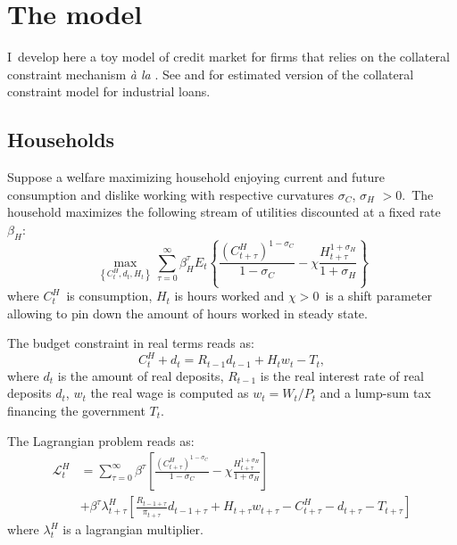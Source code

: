 \documentclass[a4paper,12pt]{article}%
\begin{document}
\FRONTPAGE


\section{The model}

I\ develop here a toy model of credit market for firms that relies on the
collateral constraint mechanism \textit{\`{a} la} \cite{kiyotaki1997credit}.
See \cite{gerali2010credit} and \cite{iacoviello2015financial} for estimated
version of the collateral constraint model for industrial loans.

\subsection{Households}

Suppose a welfare maximizing household enjoying current and future consumption
and dislike working with respective curvatures $\sigma_{C}$, $\sigma_{H}$
$>0$.\ The household maximizes the following stream of utilities discounted at
a fixed rate $\beta_{H}$:%
\begin{equation}
\max_{\left\{  C_{t}^{H},d_{t},H_{t}\right\}  }\sum_{\tau=0}^{\infty}\beta
_{H}^{\tau}E_{t}\left\{  \frac{\left(  C_{t+\tau}^{H}\right)  ^{1-\sigma_{C}}%
}{1-\sigma_{C}}-\chi\frac{H_{t+\tau}^{1+\sigma_{H}}}{1+\sigma_{H}}\right\}
\end{equation}
where $C_{t}^{H}$\ is consumption, $H_{t}$ is hours worked and $\chi>0$\ is a
shift parameter allowing to pin down the amount of hours worked in steady state.

The budget constraint in real terms reads as:%
\begin{equation}
C_{t}^{H}+d_{t}=R_{t-1}d_{t-1}+H_{t}w_{t}-T_{t},
\end{equation}
where $d_{t}$ is the amount of real deposits, $R_{t-1}$ is the real interest
rate of real deposits $d_{t}$, $w_{t}$ the real wage is computed as
$w_{t}=W_{t}/P_{t}$ and a lump-sum tax financing the government $T_{t}$.

The Lagrangian problem reads as:%
\begin{align*}
\mathcal{L}_{t}^{H}  &  =\sum_{\tau=0}^{\infty}\beta^{\tau}\left[
\frac{\left(  C_{t+\tau}^{H}\right)  ^{1-\sigma_{C}}}{1-\sigma_{C}}-\chi
\frac{H_{t+\tau}^{1+\sigma_{H}}}{1+\sigma_{H}}\right] \\
&  +\beta^{\tau}\lambda_{t+\tau}^{H}\left[  \frac{R_{t-1+\tau}}{\pi_{t+\tau}%
}d_{t-1+\tau}+H_{t+\tau}w_{t+\tau}-C_{t+\tau}^{H}-d_{t+\tau}-T_{t+\tau
}\right]
\end{align*}
where $\lambda_{t}^{H}$ is a lagrangian multiplier.
\end{document}
